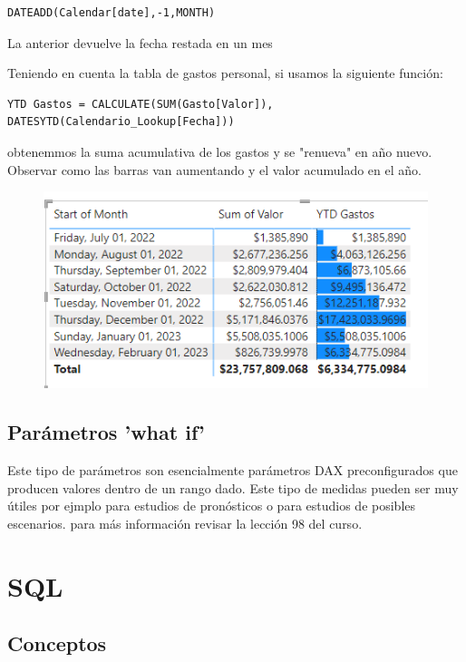 \begin{verbatim}
DATEADD(Calendar[date],-1,MONTH)
\end{verbatim}

La anterior devuelve la fecha restada en un mes

Teniendo en cuenta la tabla de gastos personal, si usamos la siguiente función:

\begin{verbatim}
YTD Gastos = CALCULATE(SUM(Gasto[Valor]), DATESYTD(Calendario_Lookup[Fecha]))
\end{verbatim}

obtenemmos la suma acumulativa de los gastos y se "renueva" en año nuevo. Observar como las barras van aumentando y el valor acumulado en el año.

\begin{figure}[H]
    \centering
    \includegraphics{Data/datafig3.png}
\end{figure}

\subsection{Parámetros 'what if'}

Este tipo de parámetros son esencialmente parámetros DAX preconfigurados que producen valores dentro de un rango dado. Este tipo de medidas pueden ser muy útiles por ejmplo para estudios de pronósticos o para estudios de posibles escenarios. para más información revisar la lección 98 del curso.


\section{SQL}



\subsection{Conceptos}

